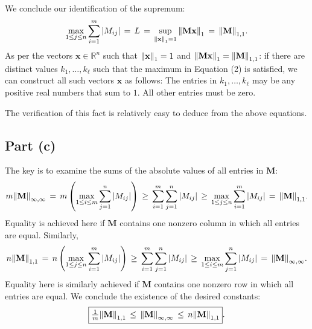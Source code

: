 \documentclass[11pt]{article}
\renewcommand{\vec}[1]{\mathbf{#1}}
\newcommand{\mat}[1]{\mathbf{#1}}
\begin{document}
We conclude our identification of the supremum:
\[
  \max\limits_{1 \le j \le n} \sum\limits_{i = 1}^{m} \abs{M_{ij}} \, = \, L \, = \,  \sup\limits_{\norm{\vec{x}}_{1} = 1} \norm{\mat{M} \vec{x}}_{1} \, = \, \norm{\mat{M}}_{1, 1}.
\]
As per the vectors $\vec{x} \in \mathbb{R}^{n}$ such that $\norm{\vec{x}}_{1} = 1$ and $\norm{\mat{M} \vec{x}}_{1} = \norm{\mat{M}}_{1, 1}$: if there are distinct values $k_{1}, \ldots, k_{\ell}$ such that the maximum in Equation (2) is satisfied, we can construct all such vectors $\vec{x}$ as follows: The entries in $k_{1}, \ldots, k_{\ell}$ may be any positive real numbers that sum to $1$. All other entries must be zero.

The verification of this fact is relatively easy to deduce from the above equations.


\subsection{Part (c)}

The key is to examine the sums of the absolute values of all entries in $\mat{M}$:
\begin{align*}
  m \norm{\mat{M}}_{\infty, \infty} \, = \, m \left( \max\limits_{1 \le i \le m} \sum\limits_{j = 1}^{n} \abs{M_{ij}} \right) \, \ge \, \sum\limits_{i = 1}^{m} \sum\limits_{j = 1}^{n} \abs{M_{ij}} \, \ge \, \max\limits_{1 \le j \le n} \sum\limits_{i = 1}^{m} \abs{M_{ij}} \, = \, \norm{\mat{M}}_{1, 1}.
\end{align*}
Equality is achieved here if $\mat{M}$ contains one nonzero column in which all entries are equal. Similarly,
\begin{align*}
  n \norm{\mat{M}}_{1, 1} \, = \, n \left( \max\limits_{1 \le j \le n} \sum\limits_{i = 1}^{m} \abs{M_{ij}} \right) \, \ge \, \sum\limits_{i = 1}^{m} \sum\limits_{j = 1}^{n} \abs{M_{ij}} \, \ge \, \max\limits_{1 \le i \le m} \sum\limits_{j = 1}^{n} \abs{M_{ij}} \, = \, \norm{\mat{M}}_{\infty, \infty}.
\end{align*}
Equality here is similarly achieved if $\mat{M}$ contains one nonzero row in which all entries are equal. We conclude the existence of the desired constants:
\[
  \boxed{\tfrac{1}{m} \norm{\mat{M}}_{1, 1} \, \le \, \norm{\mat{M}}_{\infty, \infty} \, \le \, n\norm{\mat{M}}_{1, 1}}.
\]

\end{document}
